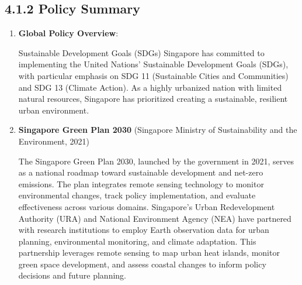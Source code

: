 \documentclass[
  letterpaper,
  DIV=11,
  numbers=noendperiod]{scrreprt}
\begin{document}
\subsection{4.1.2 Policy Summary}\label{policy-summary}

\begin{enumerate}
\def\labelenumi{\arabic{enumi}.}
\item
  \textbf{Global Policy Overview}:

  Sustainable Development Goals (SDGs) Singapore has committed to
  implementing the United Nations' Sustainable Development Goals (SDGs),
  with particular emphasis on SDG 11 (Sustainable Cities and
  Communities) and SDG 13 (Climate Action). As a highly urbanized nation
  with limited natural resources, Singapore has prioritized creating a
  sustainable, resilient urban environment.
\item
  \textbf{Singapore Green Plan 2030} (Singapore Ministry of
  Sustainability and the Environment, 2021)

  The Singapore Green Plan 2030, launched by the government in 2021,
  serves as a national roadmap toward sustainable development and
  net-zero emissions. The plan integrates remote sensing technology to
  monitor environmental changes, track policy implementation, and
  evaluate effectiveness across various domains. Singapore's Urban
  Redevelopment Authority (URA) and National Environment Agency (NEA)
  have partnered with research institutions to employ Earth observation
  data for urban planning, environmental monitoring, and climate
  adaptation. This partnership leverages remote sensing to map urban
  heat islands, monitor green space development, and assess coastal
  changes to inform policy decisions and future planning.


\end{enumerate}
\end{document}
